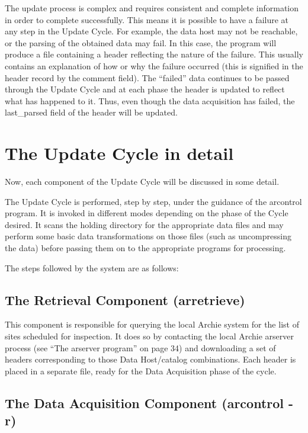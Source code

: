The update process is complex and requires consistent and complete information
in order to complete successfully. This means it is possible to have a failure
at any step in the Update Cycle. For example, the data host may not be
reachable, or the parsing of the obtained data may fail. In this case, the
program will produce a file containing a header reflecting the nature of the
failure. This usually contains an explanation of how or why the failure
occurred (this is signified in the header record by the comment field). The
``failed'' data continues to be passed through the Update Cycle and at each
phase the header is updated to reflect what has happened to it. Thus, even
though the data acquisition has failed, the last\_parsed field of the header
will be updated.


%
%
%

\section{The Update Cycle in detail}
\label{sec:update}
Now, each component of the Update Cycle will be discussed in some detail.

The Update Cycle is performed, step by step, under the guidance of the
arcontrol program. It is invoked in different modes depending on the phase of
the Cycle desired. It scans the holding directory for the appropriate data
files and may perform some basic data transformations on those files (such as
uncompressing the data) before passing them on to the appropriate programs for
processing.

The steps followed by the system are as follows:


\subsection{The Retrieval Component (arretrieve)}

This component is responsible for querying the local Archie system for the
list of sites scheduled for inspection. It does so by contacting the local
Archie arserver process (see ``The arserver program'' on page 34) and
downloading a set of headers corresponding to those Data Host/catalog
combinations. Each header is placed in a separate file, ready for the Data
Acquisition phase of the cycle.

\subsection{The Data Acquisition Component (arcontrol -r)}

